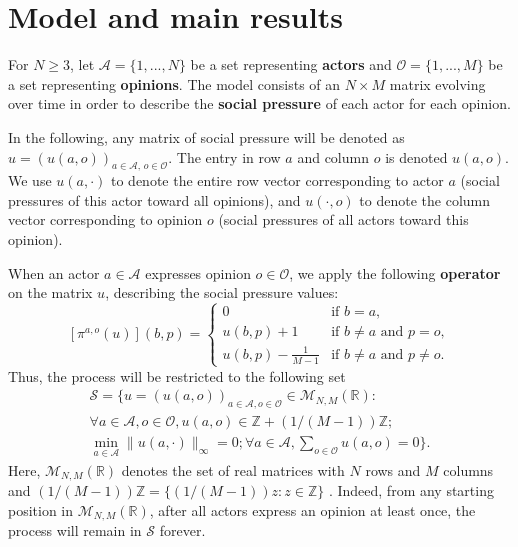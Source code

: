 \documentclass[11pt]{article}
\theoremstyle{definition}
\newcommand{\st}{\mathcal{S}}
\begin{document}
\section{Model and main results} \label{sec:modelandresults}

For $N\geq 3$, let $\mathcal{A}=\{1,...,N\}$ be a set representing \textbf{actors} and $\mathcal{O}=\{1,...,M\}$ be a set representing \textbf{opinions}. The model consists of an $N\times M$ matrix evolving over time in order to describe the \textbf{social pressure} of each actor for each opinion. 

In the following, any matrix of social pressure will be denoted as $u=(u(a,o))_{a\in\mathcal{A},\,o\in\mathcal{O}}$. The entry in row $a$ and column
$o$ is denoted $u(a,o)$. We use $u(a,\cdot)$ to denote the entire row
vector corresponding to actor $a$ (social pressures of this actor toward all
opinions), and $u(\cdot,o)$ to denote the column vector corresponding
to opinion $o$ (social pressures of all actors toward this opinion). 

When an actor $a\in\mathcal{A}$ expresses opinion $o\in\mathcal{O}$, we apply the following \textbf{operator} on the matrix $u$, describing the social pressure values:
\begin{equation}\label{modelmap}
    [\pi^{a,o}(u)](b,p)=
    \begin{cases}
        0 & \text{if $b = a$}, \\
        u(b,p) + 1 & \text{if $b\neq a$ and $p=o$}, \\
        u(b,p) - \frac{1}{M-1} & \text{if $b\neq a$ and $p\neq o$}.
    \end{cases}
\end{equation}
Thus, the process will be restricted to the following set
\begin{multline}
    \label{set_S}
    \mathcal{S} = \{u = (u(a,o))_{a\in\mathcal{A}, o\in\mathcal{O}}\in\mathcal{M}_{N,M}(\mathbb{R}): \\ \forall a\in\mathcal{A},o\in\mathcal{O}, u(a,o)\in\mathbb{Z}+(1/(M-1))\mathbb{Z};\\\min_{a\in\mathcal{A}}\|u(a,\cdot)\|_{\infty}=0;\forall a\in\mathcal{A},\sum_{o\in\mathcal{O}}u(a,o)=0 \}.
\end{multline} 
Here, $\mathcal{M}_{N,M}(\mathbb{R})$ denotes the set of real matrices with $N$ rows and $M$ columns and $(1/(M-1))\mathbb{Z}=\{(1/(M-1))z:z\in \mathbb{Z}\}$ . Indeed, from any starting position in $\mathcal{M}_{N,M}(\mathbb{R})$, after all actors express an opinion at least once, the process will remain in $\st$ forever.
\end{document}
